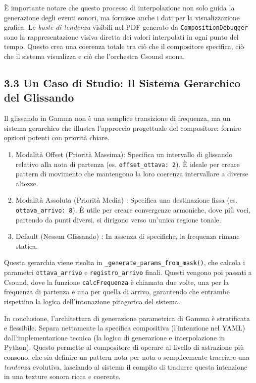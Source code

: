 È importante notare che questo processo di interpolazione non solo guida la generazione degli eventi sonori, ma fornisce anche i dati per la visualizzazione grafica. Le \textit{buste di tendenza} visibili nel PDF generato da \texttt{CompositionDebugger} sono la rappresentazione visiva diretta dei valori interpolati in ogni punto del tempo. Questo crea una coerenza totale tra ciò che il compositore specifica, ciò che il sistema visualizza e ciò che l'orchestra Csound suona.
\subsection{3.3 Un Caso di Studio: Il Sistema Gerarchico del Glissando}
Il glissando in Gamma non è una semplice transizione di frequenza, ma un sistema gerarchico che illustra l'approccio progettuale del compositore: fornire opzioni potenti con priorità chiare.

\begin{enumerate}
    \item Modalità Offset (Priorità Massima): Specifica un intervallo di glissando relativo alla nota di partenza (es. \texttt{offset\_ottava: 2}). È ideale per creare pattern di movimento che mantengono la loro coerenza intervallare a diverse altezze.
    \item Modalità Assoluta (Priorità Media) : Specifica una destinazione fissa (es. \texttt{ottava\_arrivo: 8}). È utile per creare convergenze armoniche, dove più voci, partendo da punti diversi, si dirigono verso un'unica regione tonale.
    \item Default (Nessun Glissando) : In assenza di specifiche, la frequenza rimane statica.
\end{enumerate}
Questa gerarchia viene risolta in \texttt{\_generate\_params\_from\_mask()}, che calcola i parametri \texttt{ottava\_arrivo} e \texttt{registro\_arrivo} finali. Questi vengono poi passati a Csound, dove la funzione \texttt{calcFrequenza} è chiamata due volte, una per la frequenza di partenza e una per quella di arrivo, garantendo che entrambe rispettino la logica dell'intonazione pitagorica del sistema.

In conclusione, l'architettura di generazione parametrica di Gamma è stratificata e flessibile. Separa nettamente la specifica compositiva (l'intenzione nel YAML) dall'implementazione tecnica (la logica di generazione e interpolazione in Python). Questo permette al compositore di operare al livello di astrazione più consono, che sia definire un pattern nota per nota o semplicemente tracciare una \textit{tendenza} evolutiva, lasciando al sistema il compito di tradurre questa intenzione in una texture sonora ricca e coerente.